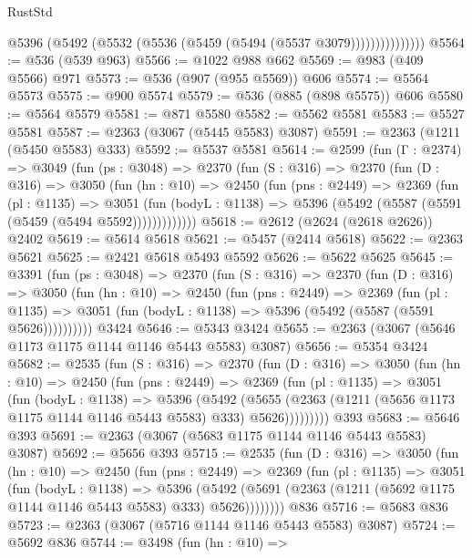 \begin{lexlean}{RustStd}
\begin{coremodule}
                    @5396 (@5492 (@5532 (@5536 (@5459 (@5494 (@5537 @3079)))))))))))))))
@5564 := @536 (@539 @963)
@5566 := @1022 @988 @662
@5569 := @983 (@409 @5566) @971
@5573 := @536 (@907 (@955 @5569)) @606
@5574 := @5564 @5573
@5575 := @900 @5574
@5579 := @536 (@885 (@898 @5575)) @606
@5580 := @5564 @5579
@5581 := @871 @5580
@5582 := @5562 @5581
@5583 := @5527 @5581
@5587 := @2363 (@3067 (@5445 @5583) @3087)
@5591 := @2363 (@1211 (@5450 @5583) @333)
@5592 := @5537 @5581
@5614 := @2599
    (fun (Γ : @2374) =>
    @3049
      (fun (ps : @3048) =>
      @2370
        (fun (S : @316) =>
        @2370
          (fun (D : @316) =>
          @3050
            (fun (hn : @10) =>
            @2450
              (fun (pns : @2449) =>
              @2369
                (fun (pl : @1135) =>
                @3051
                  (fun (bodyL : @1138) =>
                  @5396 (@5492 (@5587 (@5591 (@5459 (@5494 @5592)))))))))))))
@5618 := @2612 (@2624 (@2618 @2626)) @2402
@5619 := @5614 @5618
@5621 := @5457 (@2414 @5618)
@5622 := @2363 @5621
@5625 := @2421 @5618 @5493 @5592
@5626 := @5622 @5625
@5645 := @3391
    (fun (ps : @3048) =>
    @2370
      (fun (S : @316) =>
      @2370
        (fun (D : @316) =>
        @3050
          (fun (hn : @10) =>
          @2450
            (fun (pns : @2449) =>
            @2369
              (fun (pl : @1135) =>
              @3051 (fun (bodyL : @1138) => @5396 (@5492 (@5587 (@5591 @5626))))))))))
    @3424
@5646 := @5343 @3424
@5655 := @2363 (@3067 (@5646 @1173 @1175 @1144 @1146 @5443 @5583) @3087)
@5656 := @5354 @3424
@5682 := @2535
    (fun (S : @316) =>
    @2370
      (fun (D : @316) =>
      @3050
        (fun (hn : @10) =>
        @2450
          (fun (pns : @2449) =>
          @2369
            (fun (pl : @1135) =>
            @3051
              (fun (bodyL : @1138) =>
              @5396
                (@5492
                  (@5655
                    (@2363 (@1211 (@5656 @1173 @1175 @1144 @1146 @5443 @5583) @333) @5626)))))))))
    @393
@5683 := @5646 @393
@5691 := @2363 (@3067 (@5683 @1175 @1144 @1146 @5443 @5583) @3087)
@5692 := @5656 @393
@5715 := @2535
    (fun (D : @316) =>
    @3050
      (fun (hn : @10) =>
      @2450
        (fun (pns : @2449) =>
        @2369
          (fun (pl : @1135) =>
          @3051
            (fun (bodyL : @1138) =>
            @5396
              (@5492 (@5691 (@2363 (@1211 (@5692 @1175 @1144 @1146 @5443 @5583) @333) @5626))))))))
    @836
@5716 := @5683 @836
@5723 := @2363 (@3067 (@5716 @1144 @1146 @5443 @5583) @3087)
@5724 := @5692 @836
@5744 := @3498
    (fun (hn : @10) =>

\end{coremodule}
\end{lexlean}
